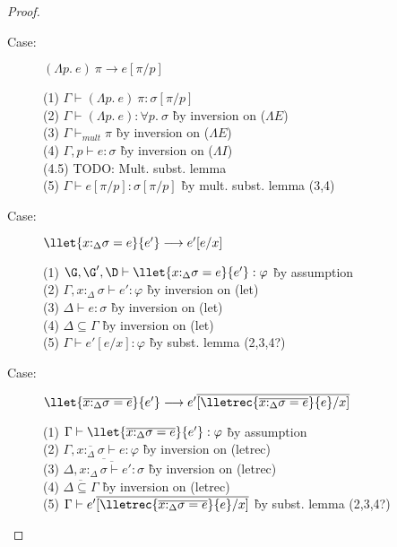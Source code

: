 \begin{proof}
\begin{description}
\item[Case:] $(\Lambda p.~e)~\pi \longrightarrow e[\pi/p]$
\begin{tabbing}
(1) $\Gamma \vdash (\Lambda p.~e)~\pi : \sigma[\pi/p]$\\
(2) $\Gamma \vdash (\Lambda p.~e) : \forall p.~\sigma$ \` by inversion on ($\Lambda E$) \\
(3) $\Gamma \vdash_{mult} \pi$ \` by inversion on ($\Lambda E$) \\
(4) $\Gamma, p \vdash e : \sigma$ \` by inversion on ($\Lambda I$) \\
(4.5) TODO: Mult. subst. lemma\\
(5) $\Gamma \vdash e[\pi/p]:\sigma[\pi/p]$ \` by mult. subst. lemma (3,4) \\
\end{tabbing}

\item[Case:] $\llet{x{:}_\Delta\sigma = e}{e'}\longrightarrow e'[e/x]$
\begin{tabbing}
(1) $\G, \G', \D\vdash \llet{x{:}_\Delta\sigma = e}{e'} : \varphi$ \` by assumption \\
(2) $\Gamma, x{:}_\Delta\sigma \vdash e' : \varphi$ \` by inversion on (let) \\
(3) $\Delta \vdash e : \sigma$ \` by inversion on (let) \\
(4) $\Delta \subseteq \Gamma$ \` by inversion on (let) \\
(5) $\Gamma \vdash e'[e/x] : \varphi$ \` by subst. lemma (2,3,4?) \\
\end{tabbing}

\item[Case:] $\llet{\overline{x{:}_\Delta\sigma = e}}{e'} \longrightarrow e'\overline{[\lletrec{\overline{x{:}_\Delta\sigma = e}}{e}/x]}$
\begin{tabbing}
(1) $\Gamma \vdash \llet{\overline{x{:}_\Delta\sigma = e}}{e'} : \varphi$ \` by assumption \\
(2) $\Gamma, \overline{x{:}_\Delta\sigma} \vdash e : \varphi$ \` by inversion on (letrec) \\
(3) $\overline{\Delta, \overline{x{:}_\Delta\sigma \vdash e' : \sigma}}$ \` by inversion on (letrec) \\
(4) $\overline{\Delta\subseteq\Gamma}$ \` by inversion on (letrec) \\
(5) $\Gamma \vdash e'\overline{[\lletrec{\overline{x{:}_\Delta\sigma = e}}{e}/x]}$ \` by subst. lemma (2,3,4?) \\
\end{tabbing}


\end{description}
\end{proof}
